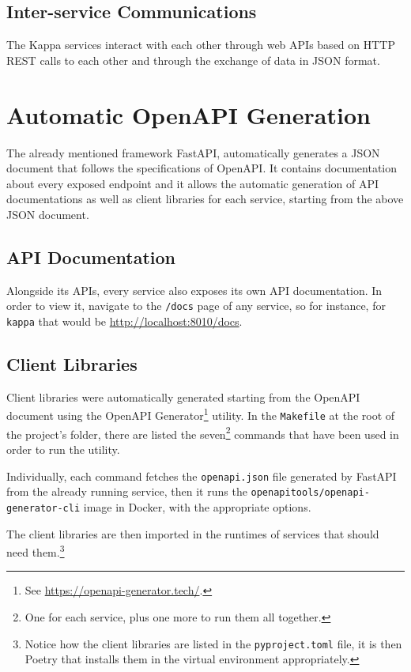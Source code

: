 \documentclass[a4paper]{ifacconf}
\begin{document}
    \subsection{Inter-service Communications}
    
    The Kappa services interact with each other through web APIs based on HTTP REST calls to each other and through the exchange of data in JSON format.
    
    \section{Automatic OpenAPI Generation}\label{sec:openapi}
    The already mentioned framework FastAPI, automatically generates a JSON document that follows the specifications of OpenAPI.
    It contains documentation about every exposed endpoint and it allows the automatic generation of API documentations as well as client libraries for each service, starting from the above JSON document.
    
    \subsection{API Documentation}
    Alongside its APIs, every service also exposes its own API documentation.
    In order to view it, navigate to the \texttt{/docs} page of any service, so for instance, for \texttt{kappa} that would be \url{http://localhost:8010/docs}.
    
    \subsection{Client Libraries}
    Client libraries were automatically generated starting from the OpenAPI document using the OpenAPI Generator\footnote{
        See \url{https://openapi-generator.tech/}.
    } utility.
    In the \texttt{Makefile} at the root of the project's folder, there are listed the seven\footnote{
        One for each service, plus one more to run them all together.
    } commands that have been used in order to run the utility.

    Individually, each command fetches the \texttt{openapi.json} file generated by FastAPI from the already running service, then it runs the \texttt{openapitools/openapi-generator-cli} image in Docker, with the appropriate options.
    
    The client libraries are then imported in the runtimes of services that should need them.\footnote{
        Notice how the client libraries are listed in the \texttt{pyproject.toml} file, it is then Poetry that installs them in the virtual environment appropriately.
    }
\end{document}
